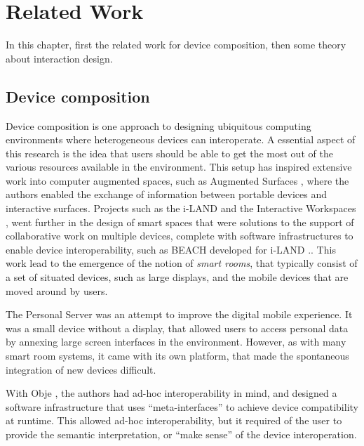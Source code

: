 \chapter{Related Work}
\label{relatedwork}

In this chapter, first the related work for device composition, then some theory about interaction design.

\section{Device composition}

Device composition is one approach to designing ubiquitous computing environments where heterogeneous devices can interoperate.
A essential aspect of this research is the idea that users should be able to get the most out of the various resources available in the environment.
This setup has inspired extensive work into computer augmented spaces, such as Augmented Surfaces \citep{Rekimoto:1999:augmentedsurfaces}, where the authors enabled the exchange of information between portable devices and interactive surfaces.
Projects such as the i-LAND \citep{Streitz:1999:iland} and the Interactive Workspaces \citep{Johanson:2002:iroom}, went further in the design of smart spaces that were solutions to the support of collaborative work on multiple devices, complete with software infrastructures to enable device interoperability, such as BEACH developed for i-LAND \citep{Tandler:2001:smartenv}..
This work lead to the emergence of the notion of \emph{smart rooms}, that typically consist of a set of situated devices, such as large displays, and the mobile devices that are moved around by users.



The Personal Server \citep{Want:2002:personalserver} was an attempt to improve the digital mobile experience.
It was a small device without a display, that allowed users to access personal data by annexing large screen interfaces in the environment.
However, as with many smart room systems, it came with its own platform, that made the spontaneous integration of new devices difficult.

With Obje \citep{Edwards:2009:obje}, the authors had ad-hoc interoperability in mind, and designed a software infrastructure that uses ``meta-interfaces'' to achieve device compatibility at runtime.
This allowed ad-hoc interoperability, but it required of the user to provide the semantic interpretation, or ``make sense'' of the device interoperation.

